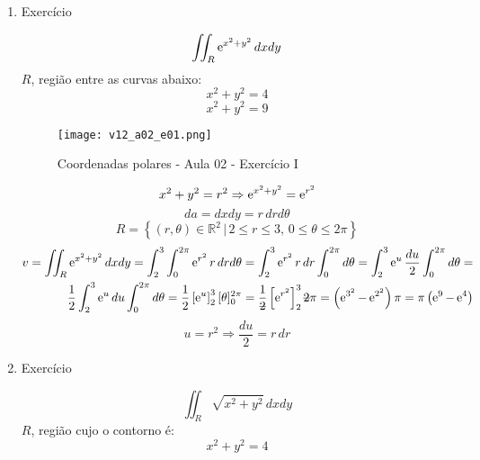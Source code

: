\begin{enumerate}
	\item Exercício
	
	\begin{equation*}
		\iint_R \operatorname{e}^{x^2 + y^2} dx dy
	\end{equation*}
	$R$, região entre as curvas abaixo:
	\begin{equation*}
		x^2 + y^2 = 4
	\end{equation*}
	\begin{equation*}
		x^2 + y^2 = 9
	\end{equation*}
	
	\begin{figure}[htb]
		\caption{Coordenadas polares - Aula 02 - Exercício I}
		\label{v12_a02_e01}
		\centering
		\texttt{[image: v12\_a02\_e01.png]}		
	\end{figure}
	
	\begin{equation*}
		x^2 + y^2 = r^2\Rightarrow	\operatorname{e}^{x^2 + y^2} = \operatorname{e}^{r^2}
	\end{equation*}
	\begin{equation*}
		da = dx dy = r\, dr d\theta
	\end{equation*}
	\begin{equation*}
		R = \left\{(r, \theta) \in \mathbb{R}^2 \,|\, 2 \leq r \leq 3,\, 0 \leq \theta \leq 2\pi\right\}
	\end{equation*}		
	\begin{align*}
		v = \iint_R \e^{x^2 + y^2} dx dy = \int_2^3 \int_0^{2\pi} \e^{r^2} r\, dr d\theta = \int_2^3 \e^{r^2} r\, dr \int_0^{2\pi} d\theta = \int_2^3 \e^u \dfrac{du}{2} \int_0^{2\pi} d\theta =\\ \dfrac{1}{2}\int_2^3 \e^u du \int_0^{2\pi} d\theta = \dfrac{1}{2} \left[\e^u\right]_2^3 [\theta]_0^{2\pi} = \dfrac{1}{\overstrike{2}} \left[\e^{r^2}\right]_2^3 \overstrike{2}\pi = \left(\e^{3^2} - \e^{2^2}\right) \pi = \pi\left(\e^9 - \e^4\right)	
	\end{align*}
	\begin{equation*}
		u = r^2 \Rightarrow \dfrac{du}{2} = r\, dr
	\end{equation*}
	
	\item Exercício
	
	\begin{equation*}
		\iint_R \sqrt{x^2 + y^2}\, dxdy
	\end{equation*}
	$R$, região cujo o contorno é:
	\begin{equation*}
		x^2 + y^2 = 4
	\end{equation*}
	

\end{enumerate}
